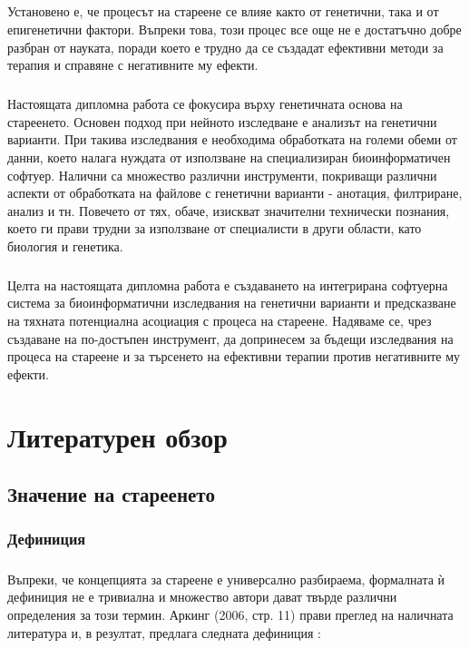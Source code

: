 \documentclass[pdftex,cyrillic,14pt,a4page,twoside,openright]{extreport}
\begin{document}
\paragraph{}
Установено е, че процесът на стареене се влияе както от генетични, така и от епигенетични фактори. Въпреки това, този процес все още не е достатъчно добре разбран от науката, поради което е трудно да се създадат ефективни методи за терапия и справяне с негативните му ефекти.

\paragraph{}
Настоящата дипломна работа се фокусира върху генетичната основа на стареенето. Основен подход при нейното изследване е анализът на генетични варианти. При такива изследвания е необходима обработката на големи обеми от данни, което налага нуждата от използване на специализиран биоинформатичен софтуер. Налични са множество различни инструменти, покриващи различни аспекти от обработката на файлове с генетични варианти - анотация, филтриране, анализ и тн. Повечето от тях, обаче, изискват значителни технически познания, което ги прави трудни за използване от специалисти в други области, като биология и генетика.

\paragraph{}
Целта на настоящата дипломна работа е създаването на интегрирана софтуерна система за биоинформатични изследвания на генетични варианти и предсказване на тяхната потенциална асоциация с процеса на стареене. Надяваме се, чрез създаване на по-достъпен инструмент, да допринесем за бъдещи изследвания на процеса на стареене и за търсенето на ефективни терапии против негативните му ефекти.
            
\chapter{Литературен обзор}
\section{Значение на стареенето}
\subsection{Дефиниция}
\paragraph{}
Въпреки, че концепцията за стареене е универсално разбираема, формалната ѝ дефиниция не е тривиална и множество автори дават твърде различни определения за този термин. Аркинг (2006, стр. 11) прави преглед на наличната литература и, в резултат, предлага следната дефиниция \cite{arking2006biology}:
\end{document}
